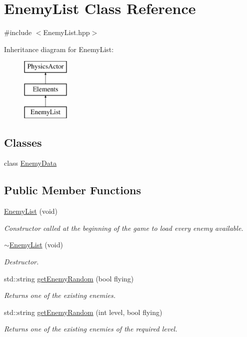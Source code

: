 \hypertarget{class_enemy_list}{\section{Enemy\+List Class Reference}
\label{class_enemy_list}
}


{\ttfamily \#include $<$Enemy\+List.\+hpp$>$}

Inheritance diagram for Enemy\+List\+:\begin{figure}[H]
\begin{center}
\leavevmode
\includegraphics[height=3.000000cm]{class_enemy_list}
\end{center}
\end{figure}
\subsection*{Classes}
\begin{DoxyCompactItemize}
\item 
class \hyperlink{class_enemy_list_1_1_enemy_data}{Enemy\+Data}
\end{DoxyCompactItemize}
\subsection*{Public Member Functions}
\begin{DoxyCompactItemize}
\item 
\hyperlink{class_enemy_list_a6f466a83f46f329fb438ec834051e1af}{Enemy\+List} (void)
\begin{DoxyCompactList}\small\item\em Constructor called at the beginning of the game to load every enemy available. \end{DoxyCompactList}\item 
\hyperlink{class_enemy_list_afa9f05e569193959e446743d718df2ef}{$\sim$\+Enemy\+List} (void)
\begin{DoxyCompactList}\small\item\em Destructor. \end{DoxyCompactList}\item 
std\+::string \hyperlink{class_enemy_list_a56a4ad617df94f2886563e4e585ff904}{get\+Enemy\+Random} (bool flying)
\begin{DoxyCompactList}\small\item\em Returns one of the existing enemies. \end{DoxyCompactList}\item 
std\+::string \hyperlink{class_enemy_list_a0392d610960c3ef6b67c27f30d0360e2}{get\+Enemy\+Random} (int level, bool flying)
\begin{DoxyCompactList}\small\item\em Returns one of the existing enemies of the required level. \end{DoxyCompactList}\end{DoxyCompactItemize}
